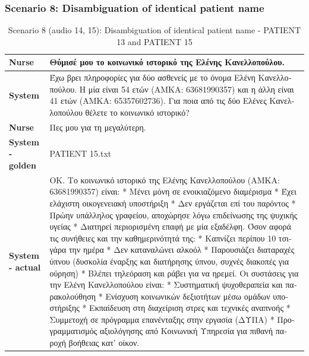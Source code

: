 \subsubsection{Scenario 8: Disambiguation of identical patient name}
\begin{table}[H]
\centering
\renewcommand{\arraystretch}{1.5} 
\begin{tabular}{|>{\bfseries}l|p{11cm}|}
\hline
Nurse & \textgreek{Θύμισέ μου το κοινωνικό ιστορικό της Ελένης Κανελλοπούλου.} \\
\hline
System & \textgreek{Έχω βρει πληροφορίες για δύο ασθενείς με το όνομα Ελένη Κανελλοπούλου. Η μία είναι 54 ετών (ΑΜΚΑ: 63681990357) και η άλλη είναι 41 ετών (ΑΜΚΑ: 65357602736). Για ποια από τις δύο Ελένες Κανελλοπούλου θέλετε το κοινωνικό ιστορικό?} \\
\hline
Nurse & \textgreek{Πες μου για τη μεγαλύτερη.} \\
\hline
System - golden & PATIENT 15.txt \\
\hline
System - actual & \textgreek{OK. Το κοινωνικό ιστορικό της Ελένης Κανελλοπούλου (ΑΜΚΑ: 63681990357) είναι:
*   Μένει μόνη σε ενοικιαζόμενο διαμέρισμα
*   Έχει ελάχιστη οικογενειακή υποστήριξη
*   Δεν εργάζεται επί του παρόντος
*   Πρώην υπάλληλος γραφείου, αποχώρησε λόγω επιδείνωσης της ψυχικής υγείας
*   Διατηρεί περιορισμένη επαφή με μία εξαδέλφη. Όσον αφορά τις συνήθειες και την καθημερινότητά της:
*   Καπνίζει περίπου 10 τσιγάρα την ημέρα
*   Δεν καταναλώνει αλκοόλ
*   Παρουσιάζει διαταραχές ύπνου (δυσκολία έναρξης και διατήρησης ύπνου, συχνές διακοπές για ούρηση)
*   Βλέπει τηλεόραση και ράβει για να ηρεμεί.
Οι συστάσεις για την Ελένη Κανελλοπούλου είναι:
*   Συστηματική ψυχοθεραπεία και παρακολούθηση
*   Ενίσχυση κοινωνικών δεξιοτήτων μέσω ομάδων υποστήριξης
*   Εκπαίδευση στη διαχείριση στρες και τεχνικές αναπνοής
*   Συμμετοχή σε πρόγραμμα επανένταξης στην εργασία (ΔΥΠΑ)
*   Προγραμματισμός αξιολόγησης από Κοινωνική Υπηρεσία για πιθανή παροχή βοήθειας κατ’ οίκον.} \\
\hline
\end{tabular}
\caption{Scenario 8 (audio 14, 15): Disambiguation of identical patient name - PATIENT 13 and PATIENT 15}
\end{table}

